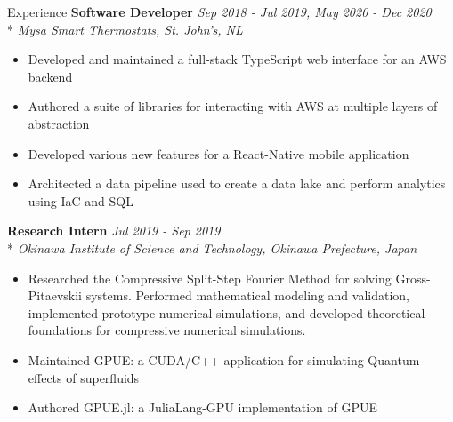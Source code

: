 \documentclass[11pt, letterpaper]{article}
\begin{document}
\begin{section}{Experience}
\textbf{Software Developer}
\hfill
\textit{Sep 2018 - Jul 2019, May 2020 - Dec 2020}\\*
\textit{Mysa Smart Thermostats, St. John's, NL}
\begin{itemize}
  \item Developed and maintained a full-stack TypeScript web interface for an AWS backend
  \item Authored a suite of libraries for interacting with AWS at multiple layers of abstraction
  \item Developed various new features for a React-Native mobile application
  \item Architected a data pipeline used to create a data lake and perform analytics using IaC and SQL \\
\end{itemize}

\textbf{Research Intern}
\hfill
\textit{Jul 2019 - Sep 2019}\\*
\textit{Okinawa Institute of Science and Technology, Okinawa Prefecture, Japan}
\begin{itemize}
  \item Researched the Compressive Split-Step Fourier Method for solving Gross-Pitaevskii systems. Performed mathematical modeling and validation, implemented prototype numerical simulations, and developed theoretical foundations for compressive numerical simulations.
  \item Maintained GPUE: a CUDA/C++ application for simulating Quantum effects of superfluids
  \item Authored GPUE.jl: a JuliaLang-GPU implementation of GPUE
\end{itemize}

\end{section}

\pagebreak
\end{document}
